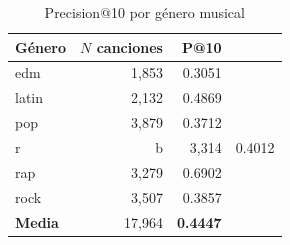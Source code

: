 \begin{table}[htbp]
  \centering
  \caption{Precision@10 por género musical}
  \label{tab:recommendation_precision_per_genre}
  \begin{tabular}{lrr}
    \toprule
    Género & $N$ canciones & P@10 \\
    \midrule
    edm & 1,853 & 0.3051 \\
    latin & 2,132 & 0.4869 \\
    pop & 3,879 & 0.3712 \\
    r&b & 3,314 & 0.4012 \\
    rap & 3,279 & 0.6902 \\
    rock & 3,507 & 0.3857 \\
    \midrule
    \textbf{Media} & 17,964 & \textbf{0.4447} \\
    \bottomrule
  \end{tabular}
\end{table}